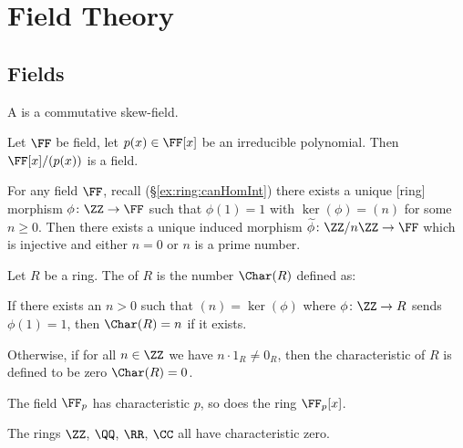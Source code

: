 
\chapter{Field Theory}

\section{Fields}

\begin{definition}[Field]
A  is a commutative skew-field.
\end{definition}

\begin{theorem}
Let $\FF$ be field, let $p(x)\in\FF[x]$ be an irreducible polynomial.
Then $\FF[x]/(p(x))$ is a field.
\end{theorem}

\begin{proposition}
For any field $\FF$, recall (\S\ref{ex:ring:canHomInt}) there exists a
unique [ring] morphism $\phi\colon\ZZ\to\FF$ such that $\phi(1)=1$
with $\ker(\phi)=(n)$ for some $n\geq0$.
Then there exists a unique induced morphism
$\widetilde{\phi}\colon\ZZ/n\ZZ\to\FF$ which is injective and either
$n=0$ or $n$ is a prime number.
\end{proposition}

\begin{definition}
Let $R$ be a ring. The  of $R$ is the
number $\Char(R)$ defined as:

If there exists an $n>0$ such that $(n)=\ker(\phi)$ where $\phi\colon\ZZ\to R$
sends $\phi(1)=1$, then $\Char(R)=n$ if it exists.

Otherwise, if for all $n\in\ZZ$ we have $n\cdot 1_{R}\neq0_{R}$, then
the characteristic of $R$ is defined to be zero $\Char(R)=0$.
\end{definition}

\begin{example}
The field $\FF_{p}$ has characteristic $p$, so does the ring $\FF_{p}[x]$.
\end{example}

\begin{example}
The rings $\ZZ$, $\QQ$, $\RR$, $\CC$ all have characteristic zero.
\end{example}


